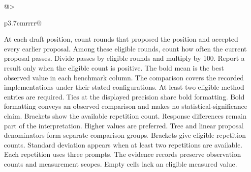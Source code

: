 \begin{table}[!htp]
\begin{tabular}{@{}>{\raggedright\arraybackslash}p{3.7cm}rrrr@{}}
\bottomrule
\end{tabular}\par\medskip
\begin{minipage}{\linewidth}\footnotesize
At each draft position, count rounds that proposed the position and accepted every earlier proposal. Among these eligible rounds, count how often the current proposal passes. Divide passes by eligible rounds and multiply by 100. Report a result only when the eligible count is positive.
The bold mean is the best observed value in each benchmark column. The comparison covers the recorded implementations under their stated configurations. At least two eligible method entries are required. Ties at the displayed precision share bold formatting. Bold formatting conveys an observed comparison and makes no statistical-significance claim. Brackets show the available repetition count. Response differences remain part of the interpretation. Higher values are preferred. Tree and linear proposal denominators form separate comparison groups.
Brackets give eligible repetition counts. Standard deviation appears when at least two repetitions are available. Each repetition uses three prompts. The evidence records preserve observation counts and measurement scopes. Empty cells lack an eligible measured value.
\end{minipage}
\end{table}

